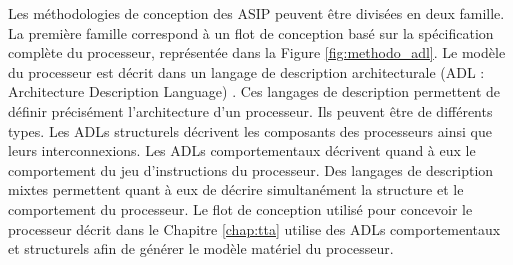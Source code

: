 Les méthodologies de conception des ASIP peuvent être divisées en deux famille. La première famille correspond à un flot de conception basé sur la spécification complète du processeur, représentée dans la Figure \ref{fig:methodo_adl}. Le modèle du processeur est décrit dans un langage de description architecturale (ADL : Architecture Description Language) \cite{mishra2011processor}. Ces langages de description permettent de définir précisément l'architecture d'un processeur. Ils peuvent être de différents types. Les ADLs structurels décrivent les composants des processeurs ainsi que leurs interconnexions. Les ADLs comportementaux décrivent quand à eux le comportement du jeu d'instructions du processeur. Des langages de description mixtes permettent quant à eux de décrire simultanément la structure et le comportement du processeur. Le flot de conception utilisé pour concevoir le processeur décrit dans le Chapitre \ref{chap:tta} utilise des ADLs comportementaux et structurels afin de générer le modèle matériel du processeur.


